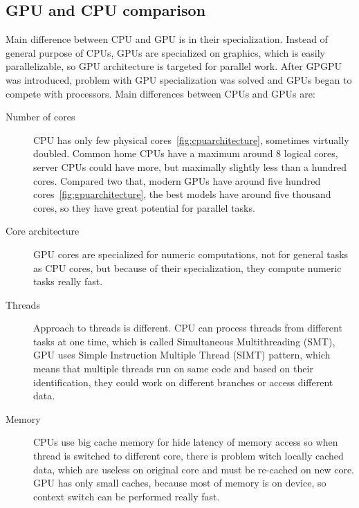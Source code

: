 \subsection{GPU and CPU comparison} \label{ssec:gpucpucomparison}
Main difference between CPU and GPU is in their specialization. Instead of general purpose of CPUs, GPUs are specialized on graphics, which is easily parallelizable, so GPU architecture is targeted for parallel work. After GPGPU was introduced, problem with GPU specialization was solved and GPUs began to compete with processors. Main differences between CPUs and GPUs are:
\begin{description}
\item[Number of cores] CPU has only few physical cores~\autoref{fig:cpuarchitecture}, sometimes virtually doubled. Common home CPUs have a maximum around 8 logical cores, server CPUs could have more, but maximally slightly less than a hundred cores. Compared two that, modern GPUs have around five hundred cores~\autoref{fig:gpuarchitecture}, the best models have around five thousand cores, so they have great potential for parallel tasks.
\item[Core architecture] GPU cores are specialized for numeric computations, not for general tasks as CPU cores, but because of their specialization, they compute numeric tasks really fast. \item[Threads] Approach to threads is different. CPU can process threads from different tasks at one time, which is called Simultaneous Multithreading (SMT), GPU uses Simple Instruction Multiple Thread (SIMT) pattern, which means that multiple threads run on same code and based on their identification, they could work on different branches or access different data.
\item[Memory] CPUs use big cache memory for hide latency of memory access so when thread is switched to different core, there is problem witch locally cached data, which are useless on original core and must be re-cached on new core. GPU has only small caches, because most of memory is on device, so context switch can be performed really fast.


\end{description}
